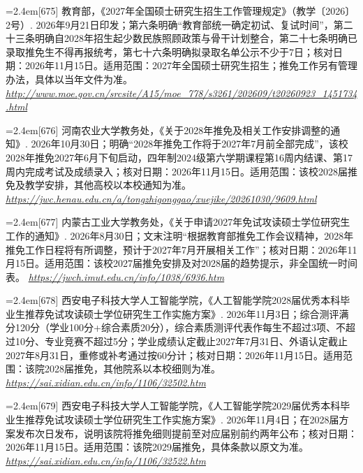 \par\noindent\hangindent=2.4em\label{src:S0821}{\color{cAccent}[675]} 教育部，《2027年全国硕士研究生招生工作管理规定》（教学〔2026〕2号）. 2026年9月21日印发；第六条明确“教育部统一确定初试、复试时间”，第二十三条明确自2028年招生起少数民族照顾政策与骨干计划整合，第二十七条明确已录取推免生不得再报统考，第七十六条明确拟录取名单公示不少于7日；核对日期：2026年11月15日。适用范围：2027年全国硕士研究生招生；推免工作另有管理办法，具体以当年文件为准。 \textit{\url{http://www.moe.gov.cn/srcsite/A15/moe_778/s3261/202609/t20260923_1451734.html}}\par
\par\noindent\hangindent=2.4em\label{src:S0822}{\color{cAccent}[676]} 河南农业大学教务处，《关于2028年推免及相关工作安排调整的通知》. 2026年10月30日；明确“2028年推免工作将于2027年7月前全部完成”，该校2028年推免2027年6月下旬启动，四年制2024级第六学期课程第16周内结课、第17周内完成考试及成绩录入；核对日期：2026年11月15日。适用范围：该校2028届推免及教学安排，其他高校以本校通知为准。 \textit{\url{https://jwc.henau.edu.cn/a/tongzhigonggao/xuejike/20261030/9609.html}}\par
\par\noindent\hangindent=2.4em\label{src:S0823}{\color{cAccent}[677]} 内蒙古工业大学教务处，《关于申请2027年免试攻读硕士学位研究生工作的通知》. 2026年8月30日；文末注明“根据教育部推免工作会议精神，2028年推免工作日程将有所调整，预计于2027年7月开展相关工作”；核对日期：2026年11月15日。适用范围：该校2027届推免安排及对2028届的趋势提示，非全国统一时间表。 \textit{\url{https://jwch.imut.edu.cn/info/1038/6936.htm}}\par
\par\noindent\hangindent=2.4em\label{src:S0824}{\color{cAccent}[678]} 西安电子科技大学人工智能学院，《人工智能学院2028届优秀本科毕业生推荐免试攻读硕士学位研究生工作实施方案》. 2026年11月3日；综合测评满分120分（学业100分+综合素质20分），综合素质测评代表作每生不超过3项、不超过10分、专业竞赛不超过5分；学业成绩认定截止2027年7月31日、外语认定截止2027年8月31日，重修或补考通过按60分计；核对日期：2026年11月15日。适用范围：该院2028届推免，其他院系以本校细则为准。 \textit{\url{https://sai.xidian.edu.cn/info/1106/32502.htm}}\par
\par\noindent\hangindent=2.4em\label{src:S0825}{\color{cAccent}[679]} 西安电子科技大学人工智能学院，《人工智能学院2029届优秀本科毕业生推荐免试攻读硕士学位研究生工作实施方案》. 2026年11月4日；在2028届方案发布次日发布，说明该院将推免细则提前至对应届别前约两年公布；核对日期：2026年11月15日。适用范围：该院2029届推免，具体条款以原文为准。 \textit{\url{https://sai.xidian.edu.cn/info/1106/32522.htm}}\par
